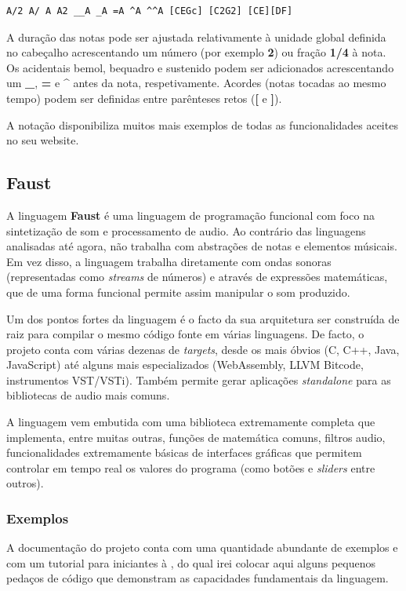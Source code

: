 \documentclass[
  oneside,
  11pt, a4paper,
  footinclude=true,
  headinclude=true,
  cleardoublepage=empty
]{scrbook}
\begin{document}
	
	\begin{lstlisting}[backgroundcolor=\color{transparent},caption={Exemplo da notação ABC},captionpos=b,xleftmargin=.24\textwidth]
	A/2 A/ A A2 __A _A =A ^A ^^A [CEGc] [C2G2] [CE][DF]
	\end{lstlisting}
	A duração das notas pode ser ajustada relativamente à unidade global definida no cabeçalho acrescentando um número (por exemplo \textbf{2}) ou fração \textbf{1/4} à nota. Os acidentais bemol, bequadro e sustenido podem ser adicionados acrescentando um \textbf{\_}, \textbf{=} e \textbf{\^} antes da nota, respetivamente. Acordes (notas tocadas ao mesmo tempo) podem ser definidas entre parênteses retos (\textbf{[} e \textbf{]}).
	
	A notação disponibiliza muitos mais exemplos de todas as funcionalidades aceites no seu website\cite{abc-notation-examples}.
	
	\subsection{Faust}
	A linguagem \textbf{Faust}\cite{faust} é uma linguagem de programação funcional com foco na sintetização de som e processamento de audio. Ao contrário das linguagens analisadas até agora, não trabalha com abstrações de notas e elementos músicais. Em vez disso, a linguagem trabalha diretamente com ondas sonoras (representadas como \textit{streams} de números) e através de expressões matemáticas, que de uma forma funcional permite assim manipular o som produzido.
	
	Um dos pontos fortes da linguagem é o facto da sua arquitetura ser construída de raiz para compilar o mesmo código fonte em várias linguagens. De facto, o projeto conta com várias dezenas de \textit{targets}, desde os mais óbvios (C, C++, Java, JavaScript) até alguns mais especializados (WebAssembly, LLVM Bitcode, instrumentos VST/VSTi). Também permite gerar aplicações \textit{standalone} para as bibliotecas de audio mais comuns\cite{faust-targets}.
	
		A linguagem vem embutida com uma biblioteca extremamente completa\cite{faust-libraries} que implementa, entre muitas outras, funções de matemática comuns, filtros audio, funcionalidades extremamente básicas de interfaces gráficas que permitem controlar em tempo real os valores do programa (como botões e \textit{sliders} entre outros).
	
	\subsubsection{Exemplos}
	A documentação do projeto conta com uma quantidade abundante de exemplos\cite{faust-examples} e com um tutorial para iniciantes à \cite{faust-quickstart}, do qual irei colocar aqui alguns pequenos pedaços de código que demonstram as capacidades fundamentais da linguagem.
	
\end{document}
